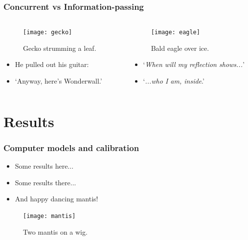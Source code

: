 \documentclass[notes, 10pt,xcolor=table]{beamer}
\begin{document}
\begin{frame}
  \frametitle{Concurrent vs Information-passing}
  \begin{columns}
    \begin{column}{0.5\textwidth}
      \begin{figure}
        \texttt{[image: gecko]}
        \caption{Gecko strumming a leaf\footnotemark[2].}
      \end{figure}
      \begin{itemize}
      \item He pulled out his guitar:
      \item `Anyway, here's Wonderwall.'
      \end{itemize}
    \end{column}
    \begin{column}{0.5\textwidth}
      \begin{figure}
        \texttt{[image: eagle]}
        \caption{Bald eagle over ice\footnotemark[3].}
      \end{figure}
      \begin{itemize}
      \item `\textit{When will my reflection shows...}'
      \item `\textit{...who I am, inside}.'
      \end{itemize}      
    \end{column}    
  \end{columns}
  \vspace{0.25cm}
\end{frame}


\section{Results}
\begin{frame}
  \frametitle{Computer models and calibration}
  \begin{itemize}
  \item Some results here...
  \item Some results there...
  \item And happy dancing mantis!
  \end{itemize}  
  \begin{figure}
    \texttt{[image: mantis]}
    \caption{Two mantis on a wig.}
  \end{figure}
\end{frame}
\end{document}
